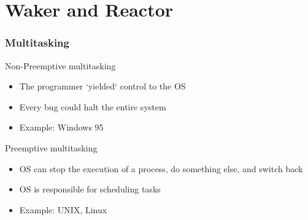 \section{Waker and Reactor} %
\begin{frame}[fragile]
    \frametitle{Multitasking}
% 
% 
% 
% 
{\color{red}Non-Preemptive multitasking}
     \begin{itemize}
         \item The programmer `yielded` control to the OS
         \item Every bug could halt the entire system
         \item Example: Windows 95
     \end{itemize}
 
{\color{red}Preemptive multitasking}
     \begin{itemize}
         \item OS can stop the execution of a process, do something else, and switch back
         \item OS is responsible for scheduling tasks
         \item Example: UNIX, Linux
     \end{itemize}
% 
\end{frame}
